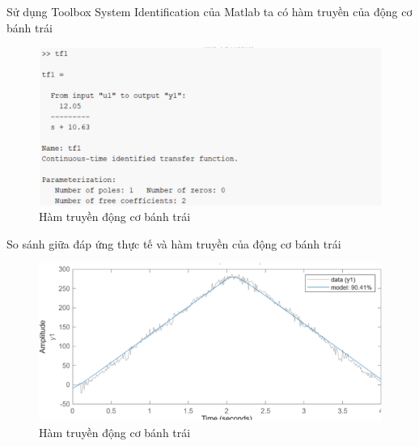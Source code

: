                \hspace*{0.6cm}Sử dụng Toolbox System Identification của Matlab ta có hàm truyền của động cơ bánh trái 
               \begin{figure}[H]
                    \centering
                    \includegraphics[width=1\textwidth]{pictures/chapter5/CJGB2_tf.png}
                    \caption{Hàm truyền động cơ bánh trái}
                    \label{CJGB2_tf}
               \end{figure} 
               \hspace*{0.6cm}So sánh giữa đáp ứng thực tế và hàm truyền của động cơ bánh trái
               \begin{figure}[H]
                    \centering
                    \includegraphics[width=1\textwidth]{pictures/chapter5/CJGB2_compare.png}
                    \caption{Hàm truyền động cơ bánh trái}
                    \label{CJGB2_compare}
               \end{figure}
     




          


